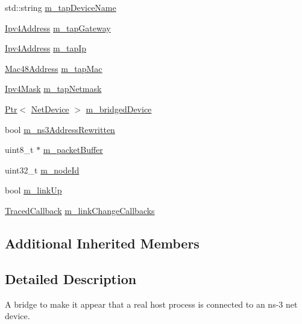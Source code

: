 \begin{DoxyCompactItemize}
\item 
std\+::string \hyperlink{classns3_1_1TapBridge_af255e0f837eb4dd30c4de28448f862f6}{m\+\_\+tap\+Device\+Name}
\item 
\hyperlink{classns3_1_1Ipv4Address}{Ipv4\+Address} \hyperlink{classns3_1_1TapBridge_ad90dad655607615d92822a361ac21fb1}{m\+\_\+tap\+Gateway}
\item 
\hyperlink{classns3_1_1Ipv4Address}{Ipv4\+Address} \hyperlink{classns3_1_1TapBridge_a8cfe2b69cef36dbf048cb9006318b41b}{m\+\_\+tap\+Ip}
\item 
\hyperlink{classns3_1_1Mac48Address}{Mac48\+Address} \hyperlink{classns3_1_1TapBridge_afdaa87d8c5a5e249ee8d94f75183e91f}{m\+\_\+tap\+Mac}
\item 
\hyperlink{classns3_1_1Ipv4Mask}{Ipv4\+Mask} \hyperlink{classns3_1_1TapBridge_a9374f832e2a96385651d27a5fbc7ba57}{m\+\_\+tap\+Netmask}
\item 
\hyperlink{classns3_1_1Ptr}{Ptr}$<$ \hyperlink{classns3_1_1NetDevice}{Net\+Device} $>$ \hyperlink{classns3_1_1TapBridge_ac4ba97368116b628d632d318d5562420}{m\+\_\+bridged\+Device}
\item 
bool \hyperlink{classns3_1_1TapBridge_a3200dc6b4b46d2f0fb13c867fcb0d118}{m\+\_\+ns3\+Address\+Rewritten}
\item 
uint8\+\_\+t $\ast$ \hyperlink{classns3_1_1TapBridge_a32b939096e18f39f76a86401d182cda5}{m\+\_\+packet\+Buffer}
\item 
uint32\+\_\+t \hyperlink{classns3_1_1TapBridge_a2176c6e2dba8e66c1dc45145cb54d395}{m\+\_\+node\+Id}
\item 
bool \hyperlink{classns3_1_1TapBridge_a335b96cae7f60f5d5bcf60234af96339}{m\+\_\+link\+Up}
\item 
\hyperlink{classns3_1_1TracedCallback}{Traced\+Callback} \hyperlink{classns3_1_1TapBridge_a3c5c9f53b15fc47d55420f4905297a06}{m\+\_\+link\+Change\+Callbacks}
\end{DoxyCompactItemize}
\subsection*{Additional Inherited Members}


\subsection{Detailed Description}
A bridge to make it appear that a real host process is connected to an ns-\/3 net device. 

